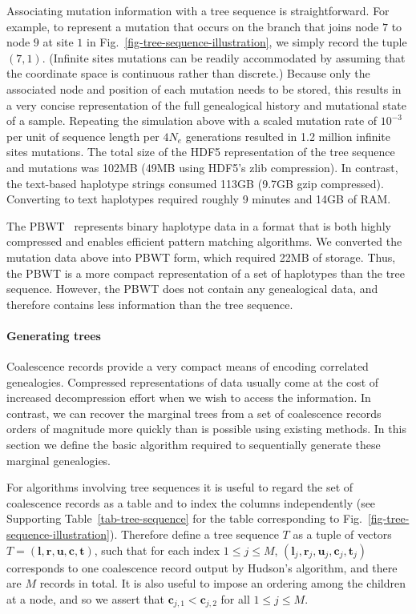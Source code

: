 \documentclass[10pt,letterpaper]{article}
\newcommand{\vect}[1]{\ensuremath{\mathbf{#1}}}
\begin{document}
Associating mutation information with a tree sequence is straightforward.  For
example, to represent a mutation that occurs on the branch that
joins node $7$ to node $9$ at site $1$ in
Fig.~\ref{fig-tree-sequence-illustration}, we simply record the tuple $(7,
1)$. (Infinite sites mutations can be readily accommodated by assuming that
the coordinate space is continuous rather than discrete.)
Because only the associated node and position of each mutation needs to
be stored, this results in a very concise representation of the full
genealogical history and mutational state of a sample. Repeating the simulation
above with a scaled mutation rate of $10^{-3}$ per unit of sequence
length per $4N_e$ generations resulted in 1.2 million infinite sites
mutations. The total size of the
HDF5 representation of the tree sequence and mutations was 102MB (49MB using
HDF5's zlib compression). In contrast, the text-based haplotype strings
consumed 113GB (9.7GB gzip compressed). Converting to text haplotypes required
roughly 9 minutes and 14GB of RAM.

The PBWT~\citep{d14} represents binary haplotype data in a format that
is both highly compressed and enables efficient pattern matching algorithms. We
converted the mutation data above into PBWT form, which required 22MB
of storage. Thus, the PBWT is a more compact representation of a set of
haplotypes than the tree sequence. However, the PBWT does not contain any
genealogical data, and therefore contains less information than the tree
sequence.

\paragraph*{Generating trees}
\label{sec-generating-trees}

Coalescence records provide a very compact means of encoding correlated
genealogies. Compressed representations of data usually come at the cost of
increased decompression effort when we wish to access the information. In
contrast, we can recover the marginal trees from a set of coalescence records
orders of magnitude more quickly than is possible using existing methods. In
this section we define the basic algorithm required to sequentially generate
these marginal genealogies.

For algorithms involving tree sequences it is useful to regard the set of
coalescence records as a table and to index the columns independently (see
Supporting Table~\ref{tab-tree-sequence} for the table corresponding to
Fig.~\ref{fig-tree-sequence-illustration}).  Therefore define a tree sequence
$T$ as a tuple of vectors $T = (\vect{l}, \vect{r}, \vect{u}, \vect{c},
\vect{t})$, such that for each index $1 \leq j \leq M$, $(\vect{l}_j,
\vect{r}_j, \vect{u}_j, \vect{c}_j, \vect{t}_j)$ corresponds to one coalescence
record output by Hudson's algorithm, and there are $M$ records in total. It is
also useful to impose an ordering among the children at a node, and so we
assert that $\vect{c}_{j, 1} < \vect{c}_{j, 2}$ for all $1 \leq j \leq M$.
\end{document}
